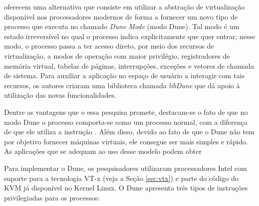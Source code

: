 \citet{belay} oferecem uma alternativa que consiste em utilizar a abstração de
virtualização disponível nos processadores modernos de forma a fornecer um novo
tipo de processo que executa no chamado \emph{Dune Mode} (modo Dune). Tal modo
é um estado irreversível no qual o processo indica explicitamente que quer
entrar; nesse modo, o processo passa a ter acesso direto, por meio dos recursos
de virtualização, a modos de operação com maior privilégio, registradores de
memória virtual, tabelas de páginas, interrupções, exceções e vetores de
chamada de sistema. Para auxiliar a aplicação no espaço de usuário a interagir
com tais recursos, os autores criaram uma biblioteca chamada \emph{libDune} que
dá apoio à utilização das novas funcionalidades.

Dentre as vantagens que o essa pesquisa promete, destacam-se o fato de que no
modo Dune o processo comporta-se como um processo normal, com a diferença de que
ele utiliza a instrução . Além disso,
devido ao fato de que o Dune não tem por objetivo fornecer máquinas virtuais,
ele consegue ser mais simples e rápido. As aplicações que se
adequam ao uso desse modelo podem obter 

Para implementar o Dune, os pesquisadores utilizaram processadores Intel com
suporte para a tecnologia VT-x (veja a Seção \ref{sec:vtx}) e parte do código do KVM já
disponível no Kernel Linux. O Dune apresenta três tipos de instruções
privilegiadas para os processos:

